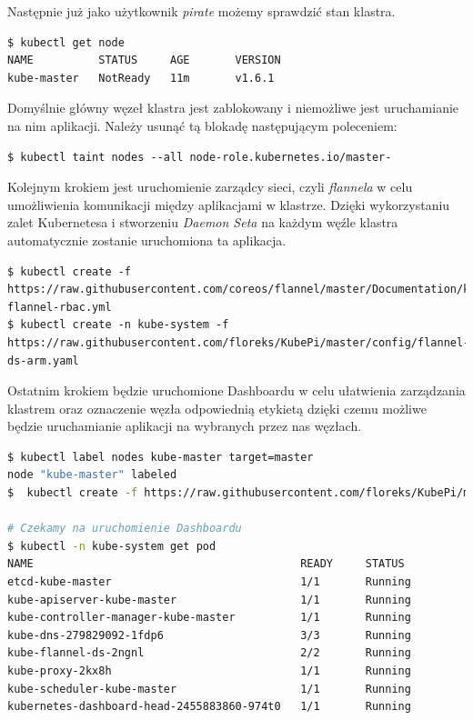 \documentclass[12pt]{report}
\begin{document}
{Następnie już jako użytkownik \textit{pirate} możemy sprawdzić stan klastra.

\begin{lstlisting}[float,floatplacement=H]
$ kubectl get node
NAME          STATUS     AGE       VERSION
kube-master   NotReady   11m       v1.6.1
\end{lstlisting}

Domyślnie główny węzeł klastra jest zablokowany i niemożliwe jest uruchamianie na nim aplikacji. Należy usunąć tą blokadę następującym poleceniem:

\begin{lstlisting}
$ kubectl taint nodes --all node-role.kubernetes.io/master-
\end{lstlisting}

Kolejnym krokiem jest uruchomienie zarządcy sieci, czyli \textit{flannela} w celu umożliwienia komunikacji między aplikacjami w klastrze. Dzięki wykorzystaniu zalet Kubernetesa i stworzeniu \textit{Daemon Seta} na każdym węźle klastra automatycznie zostanie uruchomiona ta aplikacja.

\begin{lstlisting}
$ kubectl create -f https://raw.githubusercontent.com/coreos/flannel/master/Documentation/kube-flannel-rbac.yml
$ kubectl create -n kube-system -f https://raw.githubusercontent.com/floreks/KubePi/master/config/flannel-ds-arm.yaml
\end{lstlisting}

Ostatnim krokiem będzie uruchomione Dashboardu w celu ułatwienia zarządzania klastrem oraz oznaczenie węzła odpowiednią etykietą dzięki czemu możliwe będzie uruchamianie aplikacji na wybranych przez nas węzłach. 

\begin{lstlisting}[language=bash]
$ kubectl label nodes kube-master target=master
node "kube-master" labeled
$  kubectl create -f https://raw.githubusercontent.com/floreks/KubePi/master/config/dashboard-arm.yaml

# Czekamy na uruchomienie Dashboardu
$ kubectl -n kube-system get pod
NAME                                         READY     STATUS
etcd-kube-master                             1/1       Running
kube-apiserver-kube-master                   1/1       Running
kube-controller-manager-kube-master          1/1       Running
kube-dns-279829092-1fdp6                     3/3       Running
kube-flannel-ds-2ngnl                        2/2       Running
kube-proxy-2kx8h                             1/1       Running
kube-scheduler-kube-master                   1/1       Running
kubernetes-dashboard-head-2455883860-974t0   1/1       Running


\end{lstlisting}}
\end{document}
